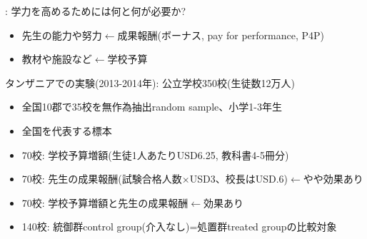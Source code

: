 \begin{frame}[t, label=MbitiFirstPage]{}
\citet{Mbiti2019}: 学力を高めるためには何と何が必要か?
\begin{itemize}
\vspace{1.0ex}\setlength{\itemsep}{1.0ex}\setlength{\baselineskip}{12pt}
\item	先生の能力や努力$\leftarrow$成果報酬(ボーナス, pay for performance, P4P) 
\item	教材や施設など$\leftarrow$学校予算\\[2ex]
\end{itemize}
\pause
タンザニアでの実験(2013-2014年): 公立学校350校(生徒数12万人)%
\begin{itemize}
\vspace{1.0ex}\setlength{\itemsep}{1.0ex}\setlength{\baselineskip}{12pt}
\item	全国10郡で35校を無作為抽出random sample、小学1-3年生
\item	全国を代表する標本
\pause
\item	70校: 学校予算増額(生徒1人あたりUSD6.25, 教科書4-5冊分)
\item	70校: 先生の成果報酬(試験合格人数$\times$USD3、校長はUSD.6)$\leftarrow$やや効果あり
\item	70校: 学校予算増額と先生の成果報酬$\leftarrow$効果あり
\item	140校: 統御群control group(介入なし)=処置群treated groupの比較対象
\end{itemize}
\end{frame}

